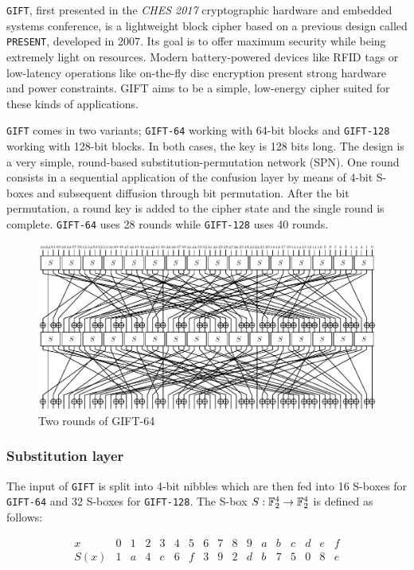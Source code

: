 \texttt{GIFT}\cite{gift:2017}, first presented in the \textit{CHES 2017}
cryptographic hardware and embedded systems conference, is a lightweight block
cipher based on a previous design called \texttt{PRESENT}, developed in 2007. Its
goal is to offer maximum security while being extremely light on resources.
Modern battery-powered devices like RFID tags or low-latency operations like
on-the-fly disc encryption present strong hardware and power constraints. GIFT
aims to be a simple, low-energy cipher suited for these kinds of applications.

\texttt{GIFT} comes in two variants; \verb|GIFT-64| working with 64-bit blocks
and \texttt{GIFT-128} working with 128-bit blocks. In both cases, the key is 128
bits long. The design is a very simple, round-based substitution-permutation
network (SPN). One round consists in a sequential application of the confusion
layer by means of 4-bit S-boxes and subsequent diffusion through bit
permutation. After the bit permutation, a round key is added to the cipher
state and the single round is complete. \texttt{GIFT-64} uses 28 rounds while
\texttt{GIFT-128} uses 40 rounds.

\begin{figure}[h!]
    \centering
    \includegraphics[width=\textwidth]{Figures/GIFT-64.pdf}
    \caption{Two rounds of GIFT-64}
\end{figure}

\subsubsection{Substitution layer}

The input of \texttt{GIFT} is split into 4-bit nibbles which are then fed into
16 S-boxes for \texttt{GIFT-64} and 32 S-boxes for \texttt{GIFT-128}. The S-box
$S:\mathbb{F}_2^{4}\rightarrow \mathbb{F}_2^{4}$ is defined as follows:

\[
    \begin{array}{l|cccccccccccccccc}
        x & 0 & 1 & 2 & 3 & 4 & 5 & 6 & 7 & 8 & 9 & a & b & c & d & e & f \\
        \hline
        S(x) & 1 & a & 4 & c & 6 & f & 3 & 9 & 2 & d & b & 7 & 5 & 0 & 8 & e
    \end{array}
\]

